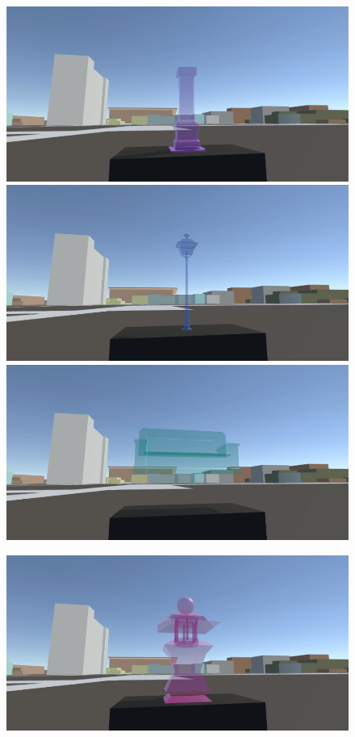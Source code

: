 \begin{appendices}
\begin{figure}
	\centering
	\includegraphics[width=0.9\linewidth]{figures/tracing_shapes/finalstudy_shapes1}
	\par \smallskip
	\includegraphics[width=0.9\linewidth]{figures/tracing_shapes/finalstudy_shapes2}
	\par \smallskip
	\includegraphics[width=0.9\linewidth]{figures/tracing_shapes/finalstudy_shapes3}
	\par \smallskip
\end{figure}
\begin{figure}
	\centering
	\includegraphics[width=0.9\linewidth]{figures/tracing_shapes/finalstudy_shapes4}

\end{figure}
\end{appendices}

